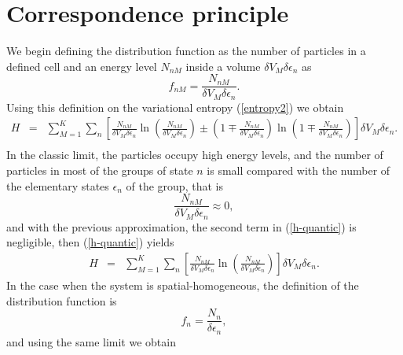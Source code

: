 \documentclass{article}
\newcommand{\de}{\delta}
\begin{document}
\section{Correspondence principle}
We begin defining the distribution function as the number of particles in a defined cell and an energy level $N_{nM}$ inside a volume $\de V_M \delta \epsilon_n$ as
\begin{equation}
    f_{nM}=\frac{N_{nM}}{ \de V_M \delta \epsilon_{n} }.
\end{equation}
Using this definition on the variational entropy (\ref{entropy2}) we obtain
\begin{eqnarray}
    H&=& \sum_{M=1}^{K} \sum_n
    \left[  
           \frac{N_{nM}}{ \de V_M\delta \epsilon_{n}} \ln 
           \left( 
                  \frac{N_{nM}}{ \de V_M\delta \epsilon_{n}}
           \right)\pm 
           \left(  
                  1\mp \frac{N_{nM}}{ \de V_M \delta \epsilon_{n}}
           \right) \ln 
           \left(  
                   1\mp \frac{N_{nM}}{ \de V_M \delta \epsilon_{n}}
           \right)
    \right] \de V_M \delta \epsilon_{n}. \nonumber \\
    \label{h-quantic} 
\end{eqnarray}
In the classic limit, the particles occupy high energy levels, and the number of particles in most of the groups of state $n$ is small compared with the number of the elementary states $\epsilon_n$ of the group, that is
\begin{equation}
    \frac{N_{nM}}{ \de V_M \delta \epsilon_{n} } \approx 0,
\end{equation}
and with the previous approximation, the second term in (\ref{h-quantic}) is negligible, then (\ref{h-quantic}) yields
\begin{eqnarray}
    H&=& \sum_{M=1}^{K} \sum_n
    \left[  
           \frac{N_{nM}}{ \de V_M \delta \epsilon_{n}} \ln 
           \left( 
                  \frac{N_{nM}}{ \de V_M \delta \epsilon_{n}}
           \right)
    \right] \de V_M \delta \epsilon_{n}. \label{h-quantic2}
\end{eqnarray}
In the case when the system is spatial-homogeneous, the definition of the distribution function is 
\begin{equation}
    f_{n}=\frac{N_{n}}{ \delta \epsilon_{n} },
\end{equation}
and using the same limit we obtain
\end{document}
